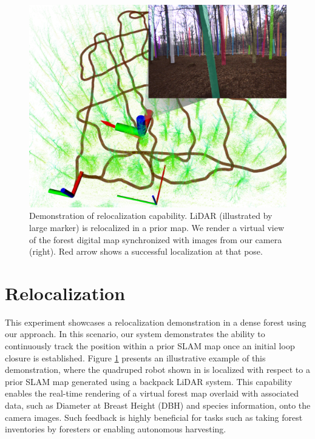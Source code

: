 \begin{figure}[t]
  \centering
  \includegraphics[width=0.99\linewidth]{pics/exp_4_relocalization_demo.png}
  \caption{Demonstration of relocalization capability. LiDAR (illustrated by large marker) is relocalized in a prior map. We render a virtual view of the forest digital map synchronized with images from our camera (right). Red arrow shows a successful localization at that pose.
  }
  \label{fig:relocalization}
\end{figure}

\section{Relocalization} 
\label{sec:exp_relocalization}
This experiment showcases a relocalization demonstration in a dense forest using our approach. In this scenario, our system demonstrates the ability to continuously track the position within a prior SLAM map once an initial loop closure is established.
Figure \ref{fig:relocalization} presents an illustrative example of this demonstration, where the quadruped robot shown in  is localized with respect to a prior SLAM map generated using a backpack LiDAR system. This capability enables the real-time rendering of a virtual forest map overlaid with associated data, such as Diameter at Breast Height (DBH) and species information, onto the camera images. Such feedback is highly beneficial for tasks such as taking forest inventories by foresters or enabling autonomous harvesting.

